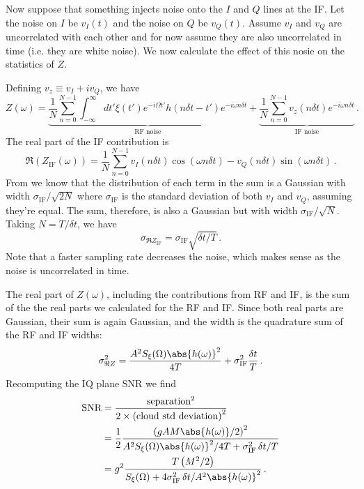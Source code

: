 
Now suppose that something injects noise onto the $I$ and $Q$ lines at the IF.
Let the noise on $I$ be $v_I(t)$ and the noise on $Q$ be $v_Q(t)$.
Assume $v_I$ and $v_Q$ are uncorrelated with each other and for now assume they are also uncorrelated in time (i.e. they are white noise).
We now calculate the effect of this nosie on the statistics of $Z$.

Defining $v_z \equiv v_I + i v_Q$, we have
\begin{equation}
Z(\omega) =
\underbrace{\frac{1}{N}\sum_{n=0}^{N-1}\int_{-\infty}^\infty dt' \xi(t')
e^{-i \Omega t'} h(n \delta t - t') e^{-i \omega n \delta t}
}_\text{RF noise}
+
\underbrace{
\frac{1}{N} \sum_{n=0}^{N-1} v_z(n \delta t) e^{-i \omega n \delta t}
}_\text{IF noise}
\, .
\end{equation}
The real part of the IF contribution is
\begin{equation}
  \Re \left( Z_\text{IF} (\omega) \right) = \frac{1}{N} \sum_{n=0}^{N-1}
      v_I(n \delta t) \cos(\omega n \delta t)
    - v_Q(n \delta t) \sin(\omega n \delta t)
  \, .
\end{equation}
From \cite{Sank:whiteNoiseDFT} we know that the distribution of each term in the sum is a Gaussian with width $\sigma_\text{IF} / \sqrt{2N}$ where $\sigma_\text{IF}$ is the standard deviation of both $v_I$ and $v_Q$, assuming they're equal.
The sum, therefore, is also a Gaussian but with width $\sigma_\text{IF} / \sqrt{N}$.
Taking $N = T / \delta t$, we have
\begin{equation}
  \sigma_{\Re Z_\text{IF}} = \sigma_\text{IF} \sqrt{\delta t / T} \, .
\end{equation}
Note that a faster sampling rate decreases the noise, which makes sense as the noise is uncorrelated in time.


The real part of $Z(\omega)$, including the contributions from RF and IF, is the sum of the the real parts we calculated for the RF and IF.
Since both real parts are Gaussian, their sum is again Gaussian, and the width is the quadrature sum of the RF and IF widths:
\begin{equation}
  \sigma_{\Re Z}^2 =
    \frac{A^2 S_\xi(\Omega) \abs{h(\omega)}^2}{4T}
    + \sigma_\text{IF}^2 \frac{\delta t}{T} \, .
\end{equation}
Recomputing the IQ plane SNR we find
\begin{align}
  \text{SNR}
    &= \frac{\text{separation}^2}{2 \times \left( \text{cloud std deviation} \right)^2} \nonumber \\
    &= \frac{1}{2}
       \frac{\left( g A M \abs{h(\omega)} / 2 \right)^2}
            {A^2 S_\xi(\Omega) \abs{h(\omega)}^2 / 4T + \sigma_\text{IF}^2 \, \delta t / T} \nonumber \\
    &= g^2 \frac{T \left( M^2 / 2 \right)}
            {S_\xi(\Omega) + 4 \sigma_\text{IF}^2 \, \delta t / A^2 \abs{h(\omega)}^2} \nonumber
  \, .
\end{align}

